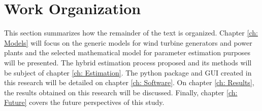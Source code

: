 \section{Work Organization}

This section summarizes how the remainder of the text is organized. Chapter \ref{ch: Models} will focus on the generic models for wind turbine generators and power plants and the selected mathematical model for parameter estimation purposes will be presented. The hybrid estimation process proposed and its methods will be subject of chapter \ref{ch: Estimation}. The python package and GUI created in this research will be detailed on chapter \ref{ch: Software}. On chapter \ref{ch: Results}, the results obtained on this research will be discussed. Finally, chapter \ref{ch: Future} covers the future perspectives of this study.